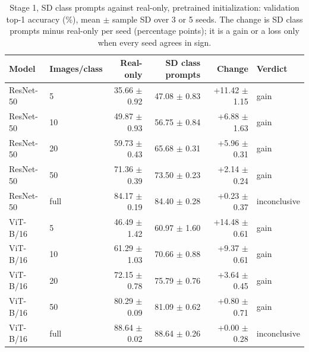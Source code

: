 \begin{table}[H]
\centering
\caption{Stage 1, SD class prompts against real-only, pretrained initialization: validation top-1 accuracy (\%), mean $\pm$ sample SD over 3 or 5 seeds. The change is SD class prompts minus real-only per seed (percentage points); it is a gain or a loss only when every seed agrees in sign.}
\label{tab:stage1-pretrained-accuracy-sd_prompt}
\begin{tabular}{llrrrl}
\toprule
Model & Images/class & Real-only & SD class prompts & Change & Verdict \\
\midrule
ResNet-50 & 5 & 35.66 $\pm$ 0.92 & 47.08 $\pm$ 0.83 & +11.42 $\pm$ 1.15 & gain \\
ResNet-50 & 10 & 49.87 $\pm$ 0.93 & 56.75 $\pm$ 0.84 & +6.88 $\pm$ 1.63 & gain \\
ResNet-50 & 20 & 59.73 $\pm$ 0.43 & 65.68 $\pm$ 0.31 & +5.96 $\pm$ 0.31 & gain \\
ResNet-50 & 50 & 71.36 $\pm$ 0.39 & 73.50 $\pm$ 0.23 & +2.14 $\pm$ 0.24 & gain \\
ResNet-50 & full & 84.17 $\pm$ 0.19 & 84.40 $\pm$ 0.28 & +0.23 $\pm$ 0.37 & inconclusive \\
\midrule
ViT-B/16 & 5 & 46.49 $\pm$ 1.42 & 60.97 $\pm$ 1.60 & +14.48 $\pm$ 0.61 & gain \\
ViT-B/16 & 10 & 61.29 $\pm$ 1.03 & 70.66 $\pm$ 0.88 & +9.37 $\pm$ 0.61 & gain \\
ViT-B/16 & 20 & 72.15 $\pm$ 0.78 & 75.79 $\pm$ 0.76 & +3.64 $\pm$ 0.45 & gain \\
ViT-B/16 & 50 & 80.29 $\pm$ 0.09 & 81.09 $\pm$ 0.62 & +0.80 $\pm$ 0.71 & gain \\
ViT-B/16 & full & 88.64 $\pm$ 0.02 & 88.64 $\pm$ 0.26 & +0.00 $\pm$ 0.28 & inconclusive \\
\bottomrule
\end{tabular}
\end{table}
